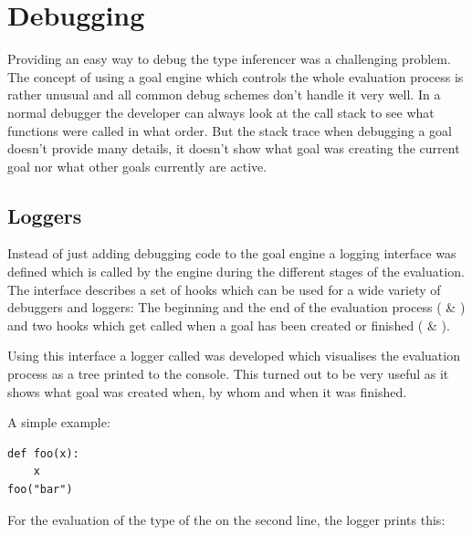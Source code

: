 \documentclass[12pt,halfparskip,DIV11,BCOR10mm]{scrreprt}
\begin{document}

\section{Debugging}

Providing an easy way to debug the type inferencer was a challenging problem. The concept of using a goal engine which controls the whole evaluation process is rather unusual and all common debug schemes don't handle it very well. In a normal debugger the developer can always look at the call stack to see what functions were called in what order. But the stack trace when debugging a goal doesn't provide many details, it doesn't show what goal was creating the current goal nor what other goals currently are active.

\subsection{Loggers} 

Instead of just adding debugging code to the goal engine a logging interface was defined which is called by the engine during the different stages of the evaluation. The interface  describes a set of hooks which can be used for a wide variety of debuggers and loggers: The beginning and the end of the evaluation process ( \& ) and two hooks which get called when a goal has been created or finished ( \& ).

Using this interface a logger called  was developed which visualises the evaluation process as a tree printed to the console. This turned out to be very useful as it shows what goal was created when, by whom and when it was finished.

A simple example:

\begin{lstlisting}
def foo(x):
    x
foo("bar")
\end{lstlisting}

For the evaluation of the type of the  on the second line, the logger prints this:
\end{document}
